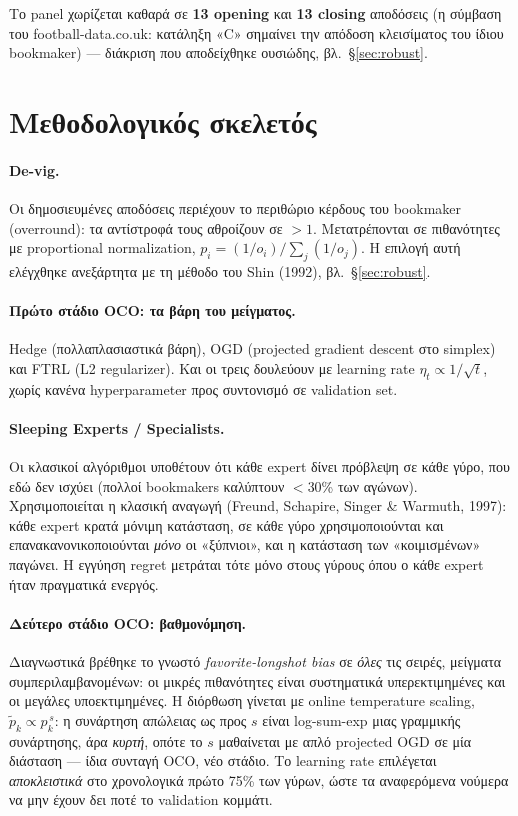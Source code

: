 \documentclass[11pt,a4paper]{article}
\renewcommand{\_}{\oldunderscore\allowbreak}
\begin{document}
Το panel χωρίζεται καθαρά σε \textbf{13 opening} και \textbf{13 closing} αποδόσεις (η
σύμβαση του football-data.co.uk: κατάληξη «C» σημαίνει την απόδοση κλεισίματος του ίδιου
bookmaker) --- διάκριση που αποδείχθηκε ουσιώδης, βλ.\ \S\ref{sec:robust}.

\section{Μεθοδολογικός σκελετός}

\paragraph{De-vig.} Οι δημοσιευμένες αποδόσεις περιέχουν το περιθώριο κέρδους του bookmaker
(overround): τα αντίστροφά τους αθροίζουν σε $>1$. Μετατρέπονται σε πιθανότητες με
proportional normalization, $p_i = (1/o_i) / \sum_j (1/o_j)$. Η επιλογή αυτή ελέγχθηκε
ανεξάρτητα με τη μέθοδο του Shin (1992), βλ.\ \S\ref{sec:robust}.

\paragraph{Πρώτο στάδιο OCO: τα βάρη του μείγματος.} Hedge (πολλαπλασιαστικά βάρη), OGD
(projected gradient descent στο simplex) και FTRL (L2 regularizer). Και οι τρεις δουλεύουν με
learning rate $\eta_t \propto 1/\sqrt{t}$, χωρίς κανένα hyperparameter προς συντονισμό σε
validation set.

\paragraph{Sleeping Experts / Specialists.} Οι κλασικοί αλγόριθμοι υποθέτουν ότι κάθε expert
δίνει πρόβλεψη σε κάθε γύρο, που εδώ δεν ισχύει (πολλοί bookmakers καλύπτουν $<$30\% των
αγώνων). Χρησιμοποιείται η κλασική αναγωγή (Freund, Schapire, Singer \& Warmuth, 1997): κάθε
expert κρατά μόνιμη κατάσταση, σε κάθε γύρο χρησιμοποιούνται και επανακανονικοποιούνται
\emph{μόνο} οι «ξύπνιοι», και η κατάσταση των «κοιμισμένων» παγώνει. Η εγγύηση regret
μετράται τότε μόνο στους γύρους όπου ο κάθε expert ήταν πραγματικά ενεργός.

\paragraph{Δεύτερο στάδιο OCO: βαθμονόμηση.} Διαγνωστικά βρέθηκε το γνωστό
\emph{favorite-longshot bias} σε \emph{όλες} τις σειρές, μείγματα συμπεριλαμβανομένων: οι
μικρές πιθανότητες είναι συστηματικά υπερεκτιμημένες και οι μεγάλες υποεκτιμημένες. Η
διόρθωση γίνεται με online temperature scaling, $\tilde p_k \propto p_k^{\,s}$: η συνάρτηση
απώλειας ως προς $s$ είναι log-sum-exp μιας γραμμικής συνάρτησης, άρα \emph{κυρτή}, οπότε το
$s$ μαθαίνεται με απλό projected OGD σε μία διάσταση --- ίδια συνταγή OCO, νέο στάδιο. Το
learning rate επιλέγεται \emph{αποκλειστικά} στο χρονολογικά πρώτο 75\% των γύρων, ώστε τα
αναφερόμενα νούμερα να μην έχουν δει ποτέ το validation κομμάτι.
\end{document}
